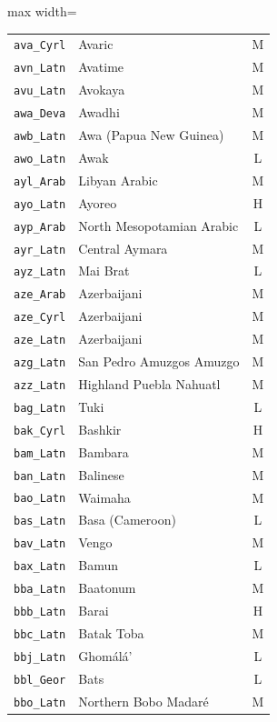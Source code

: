 {\begin{adjustbox}{max width=\textwidth}
\begin{tabular}{llc}
        \texttt{ava\_Cyrl} & Avaric & M \\
        \texttt{avn\_Latn} & Avatime & M \\
        \texttt{avu\_Latn} & Avokaya & M \\
        \texttt{awa\_Deva} & Awadhi & M \\
        \texttt{awb\_Latn} & Awa (Papua New Guinea) & M \\
        \texttt{awo\_Latn} & Awak & L \\
        \texttt{ayl\_Arab} & Libyan Arabic & M \\
        \texttt{ayo\_Latn} & Ayoreo & H \\
        \texttt{ayp\_Arab} & North Mesopotamian Arabic & L \\
        \texttt{ayr\_Latn} & Central Aymara & M \\
        \texttt{ayz\_Latn} & Mai Brat & L \\
        \texttt{aze\_Arab} & Azerbaijani & M \\
        \texttt{aze\_Cyrl} & Azerbaijani & M \\
        \texttt{aze\_Latn} & Azerbaijani & M \\
        \texttt{azg\_Latn} & San Pedro Amuzgos Amuzgo & M \\
        \texttt{azz\_Latn} & Highland Puebla Nahuatl & M \\
        \texttt{bag\_Latn} & Tuki & L \\
        \texttt{bak\_Cyrl} & Bashkir & H \\
        \texttt{bam\_Latn} & Bambara & M \\
        \texttt{ban\_Latn} & Balinese & M \\
        \texttt{bao\_Latn} & Waimaha & M \\
        \texttt{bas\_Latn} & Basa (Cameroon) & L \\
        \texttt{bav\_Latn} & Vengo & M \\
        \texttt{bax\_Latn} & Bamun & L \\
        \texttt{bba\_Latn} & Baatonum & M \\
        \texttt{bbb\_Latn} & Barai & H \\
        \texttt{bbc\_Latn} & Batak Toba & M \\
        \texttt{bbj\_Latn} & Ghomálá' & L \\
        \texttt{bbl\_Geor} & Bats & L \\
        \texttt{bbo\_Latn} & Northern Bobo Madaré & M \\

\end{tabular}
\end{adjustbox}}
